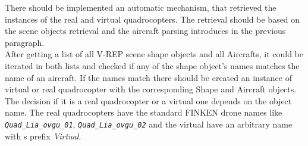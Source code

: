     There should be implemented an automatic mechanism, that retrieved the instances of the real and virtual quadrocopters. The retrieval should be based on the scene objects retrieval and the aircraft parsing introduces in the previous paragraph. \\
    After getting a list of all V-REP scene shape objects and all Aircrafts, it could be iterated in both lists and checked if any of the shape object's names matches the name of an aircraft. If the names match there should be created an instance of virtual or real quadrocopter with the corresponding Shape and Aircraft objects.
    The decision if it is a real quadrocopter or a virtual one depends on the object name. The real quadrocopters have the standard FINKEN drone names like \textit{\texttt{Quad\_Lia\_ovgu\_01}}, \textit{\texttt{Quad\_Lia\_ovgu\_02}} and the virtual have an arbitrary name with s prefix \textit{Virtual}.

 

  

